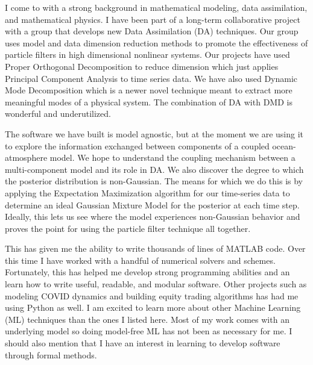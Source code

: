 \documentclass[12pt, letter]{awesome-cv}
\begin{document}
\makecvheader
\makelettertitle
\begin{cvletter}


I come to with a strong background in mathematical modeling, data assimilation, and mathematical physics. I have been part of a long-term collaborative project with a group that develops new Data Assimilation (DA) techniques. Our group uses model and data dimension reduction methods to promote the effectiveness of particle filters in high dimensional nonlinear systems. Our projects have used Proper Orthogonal Decomposition to reduce dimension which just applies Principal Component Analysis to time series data. We have also used Dynamic Mode Decomposition which is a newer novel technique meant to extract more meaningful modes of a physical system. The combination of DA with DMD is wonderful and underutilized.

The software we have built is model agnostic, but at the moment we are using it to explore the information exchanged between components of a coupled ocean-atmosphere model. We hope to understand the coupling mechanism between a multi-component model and its role in DA. We also discover the degree to which the posterior distribution is non-Gaussian. The means for which we do this is by applying the Expectation Maximization algorithm for our time-series data to determine an ideal Gaussian Mixture Model for the posterior at each time step. Ideally, this lets us see where the model experiences non-Gaussian behavior and proves the point for using the particle filter technique all together.

This has given me the ability to write thousands of lines of MATLAB code. Over this time I have worked with a handful of numerical solvers and schemes. Fortunately, this has helped me develop strong programming abilities and an learn how to write useful, readable, and modular software. Other projects such as modeling COVID dynamics and building equity trading algorithms has had me using Python as well. I am excited to learn more about other Machine Learning (ML) techniques than the ones I listed here. Most of my work comes with an underlying model so doing model-free ML has not been as necessary for me. I should also mention that I have an interest in learning to develop software through formal methods. 


\end{cvletter}
\end{document}
